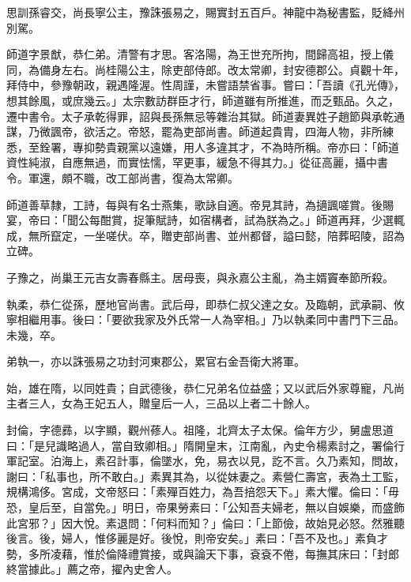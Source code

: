 \begin{pinyinscope}
 思訓孫睿交，尚長寧公主，豫誅張易之，賜實封五百戶。神龍中為秘書監，貶絳州別駕。



 師道字景猷，恭仁弟。清警有才思。客洛陽，為王世充所拘，間歸高祖，授上儀同，為備身左右。尚桂陽公主，除吏部侍郎。改太常卿，封安德郡公。貞觀十年，拜侍中，參豫朝政，親遇隆渥。性周謹，未嘗語禁省事。嘗曰：「吾讀《孔光傳》，想其餘風，或庶幾云。」太宗數訪群臣才行，師道雖有所推進，而乏甄品。久之，遷中書令。太子承乾得罪，詔與長孫無忌等雜治其獄。師道妻異姓子趙節與承乾通謀，乃微諷帝，欲活之。帝怒，罷為吏部尚書。師道起貴胄，四海人物，非所練悉，至銓署，專抑勢貴親黨以遠嫌，用人多違其才，不為時所稱。帝亦曰：「師道資性純淑，自應無過，而實怯懦，罕更事，緩急不得其力。」從征高麗，攝中書令。軍還，頗不職，改工部尚書，復為太常卿。



 師道善草隸，工詩，每與有名士燕集，歌詠自適。帝見其詩，為擿諷嗟賞。後賜宴，帝曰：「聞公每酣賞，捉筆賦詩，如宿構者，試為朕為之。」師道再拜，少選輒成，無所竄定，一坐嗟伏。卒，贈吏部尚書、並州都督，謚曰懿，陪葬昭陵，詔為立碑。



 子豫之，尚巢王元吉女壽春縣主。居母喪，與永嘉公主亂，為主婿竇奉節所殺。



 執柔，恭仁從孫，歷地官尚書。武后母，即恭仁叔父達之女。及臨朝，武承嗣、攸寧相繼用事。後曰：「要欲我家及外氏常一人為宰相。」乃以執柔同中書門下三品。未幾，卒。



 弟執一，亦以誅張易之功封河東郡公，累官右金吾衛大將軍。



 始，雄在隋，以同姓貴；自武德後，恭仁兄弟名位益盛；又以武后外家尊寵，凡尚主者三人，女為王妃五人，贈皇后一人，三品以上者二十餘人。



 封倫，字德彞，以字顯，觀州蓚人。祖隆，北齊太子太保。倫年方少，舅盧思道曰：「是兒識略過人，當自致卿相。」隋開皇末，江南亂，內史令楊素討之，署倫行軍記室。泊海上，素召計事，倫墜水，免，易衣以見，訖不言。久乃素知，問故，謝曰：「私事也，所不敢白。」素異其為，以從妹妻之。素營仁壽宮，表為土工監，規構鴻侈。宮成，文帝怒曰：「素殫百姓力，為吾掊怨天下。」素大懼。倫曰：「毋恐，皇后至，自當免。」明日，帝果勞素曰：「公知吾夫婦老，無以自娛樂，而盛飾此宮邪？」因大悅。素退問：「何料而知？」倫曰：「上節儉，故始見必怒。然雅聽後言。後，婦人，惟侈麗是好。後悅，則帝安矣。」素曰：「吾不及也。」素負才勢，多所凌藉，惟於倫降禮賞接，或與論天下事，袞袞不倦，每撫其床曰：「封郎終當據此。」薦之帝，擢內史舍人。




\end{pinyinscope}
